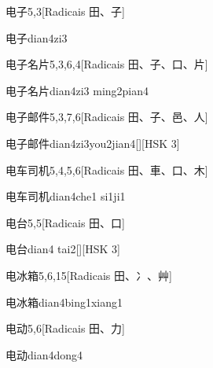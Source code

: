 \begin{entry}{电子}{5,3}[Radicais ⽥、⼦]
  \begin{phonetics}{电子}{dian4zi3}
  \end{phonetics}
\end{entry}

\begin{entry}{电子名片}{5,3,6,4}[Radicais ⽥、⼦、⼝、⽚]
  \begin{phonetics}{电子名片}{dian4zi3 ming2pian4}
  \end{phonetics}
\end{entry}

\begin{entry}{电子邮件}{5,3,7,6}[Radicais ⽥、⼦、⾢、⼈]
  \begin{phonetics}{电子邮件}{dian4zi3you2jian4}[][HSK 3]
  \end{phonetics}
\end{entry}

\begin{entry}{电车司机}{5,4,5,6}[Radicais ⽥、⾞、⼝、⽊]
  \begin{phonetics}{电车司机}{dian4che1 si1ji1}
  \end{phonetics}
\end{entry}

\begin{entry}{电台}{5,5}[Radicais ⽥、⼝]
  \begin{phonetics}{电台}{dian4 tai2}[][HSK 3]
  \end{phonetics}
\end{entry}

\begin{entry}{电冰箱}{5,6,15}[Radicais ⽥、⼎、⾋]
  \begin{phonetics}{电冰箱}{dian4bing1xiang1}
  \end{phonetics}
\end{entry}

\begin{entry}{电动}{5,6}[Radicais ⽥、⼒]
  \begin{phonetics}{电动}{dian4dong4}
  \end{phonetics}
\end{entry}


